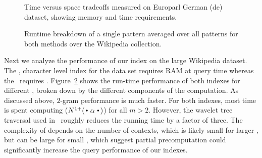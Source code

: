 \begin{figure}[tb]

\caption{Time versus space tradeoffs measured on Europarl German (de) dataset, 
showing memory and time requirements.}
\label{fig:spacetime}
\end{figure}

\begin{figure}[!tb]

\caption{Runtime breakdown of a single pattern averaged over all patterns for both methods over the Wikipedia collection.}
\label{fig:wikitime}
\end{figure}

Next we analyze the performance of our index on the large Wikipedia dataset.
The \singleCST, character level index for the data set requires  RAM
at query time whereas the \dualCST\ requires . Figure~\ref{fig:wikitime}
shows the run-time performance of both indexes for different \ngrams, broken
down by the different components of the computation. As discussed above,
$2$-gram performance is much faster. For both indexes, most time is spent
computing \nlplusfrontbackname ($\nlplus{\dotpatdot}$) for all $m>2$. However,
the wavelet tree traversal used in \singleCST\ roughly reduces the running time
by a factor of three. The complexity of \nlplusfrontbackname depends on the
number of contexts, which is likely small for larger \ngrams, but can be large
for small \ngrams, which suggest partial precomputation could significantly
increase the query performance of our indexes.







